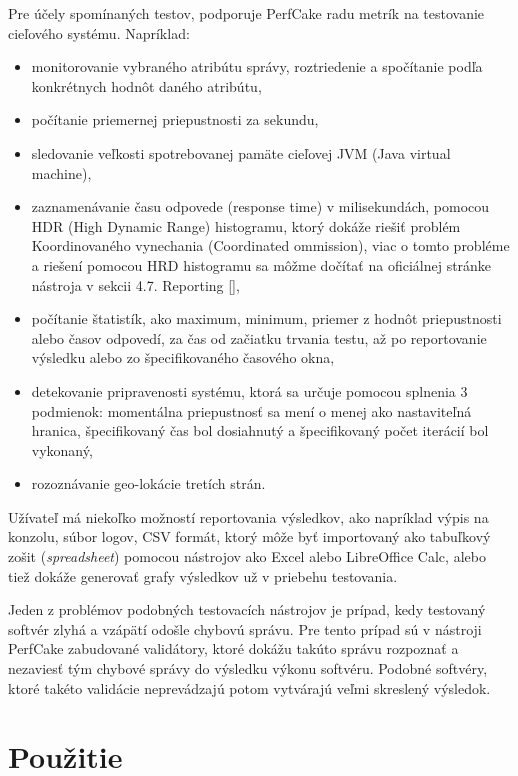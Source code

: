 Pre účely spomínaných testov, podporuje PerfCake radu metrík na testovanie cieľového systému. Napríklad:
\begin{itemize}
\item monitorovanie vybraného atribútu správy, roztriedenie a spočítanie podľa konkrétnych hodnôt daného atribútu,
\item počítanie priemernej priepustnosti za sekundu,
\item sledovanie veľkosti spotrebovanej pamäte cieľovej JVM (Java virtual machine),
\item zaznamenávanie času odpovede (response time) v milisekundách, pomocou HDR (High Dynamic Range) histogramu, ktorý dokáže riešiť problém Koordinovaného vynechania (Coordinated ommission), viac o tomto probléme a riešení pomocou HRD histogramu sa môžme dočítať na oficiálnej stránke nástroja v sekcii 4.7. Reporting [],
\item počítanie štatistík, ako maximum, minimum, priemer z hodnôt priepustnosti alebo časov odpovedí, za čas od začiatku trvania testu, až po reportovanie výsledku alebo zo špecifikovaného časového okna,
\item detekovanie pripravenosti systému, ktorá sa určuje pomocou splnenia 3 podmienok: momentálna priepustnosť sa mení o menej ako nastaviteľná hranica, špecifikovaný čas bol dosiahnutý a špecifikovaný počet iterácií bol vykonaný,
\item  rozoznávanie geo-lokácie tretích strán.
\end{itemize}

Užívateľ má niekoľko možností reportovania výsledkov, ako napríklad výpis na konzolu, súbor logov, CSV formát, ktorý môže byť importovaný ako tabuľkový zošit (\textit{spreadsheet}) pomocou nástrojov ako Excel alebo LibreOffice Calc, alebo tiež dokáže generovať grafy výsledkov už v priebehu testovania. 

Jeden z problémov podobných testovacích nástrojov je prípad, kedy testovaný softvér zlyhá a vzápätí odošle chybovú správu. Pre tento prípad sú v nástroji PerfCake zabudované validátory, ktoré dokážu takúto správu rozpoznať a nezaviesť tým chybové správy do výsledku výkonu softvéru. Podobné softvéry, ktoré takéto validácie neprevádzajú potom vytvárajú veľmi skreslený výsledok.

\section{Použitie}

